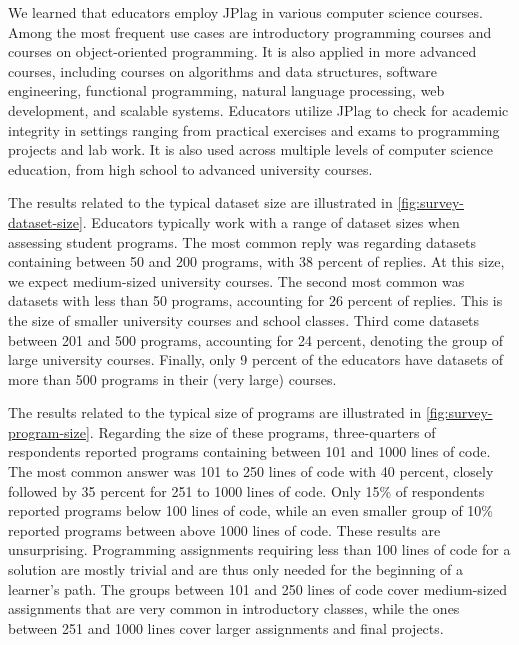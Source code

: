 We learned that educators employ JPlag in various computer science courses.
Among the most frequent use cases are introductory programming courses and courses on object-oriented programming.
It is also applied in more advanced courses, including courses on algorithms and data structures, software engineering, functional programming, natural language processing, web development, and scalable systems.
Educators utilize JPlag to check for academic integrity in settings ranging from practical exercises and exams to programming projects and lab work. It is also used across multiple levels of computer science education, from high school to advanced university courses.

The results related to the typical dataset size are illustrated in \autoref{fig:survey-dataset-size}.
Educators typically work with a range of dataset sizes when assessing student programs.
The most common reply was regarding datasets containing between 50 and 200 programs, with 38 percent of replies.
At this size, we expect medium-sized university courses.
The second most common was datasets with less than 50 programs, accounting for 26 percent of replies.
This is the size of smaller university courses and school classes.
Third come datasets between 201 and 500 programs, accounting for 24 percent, denoting the group of large university courses.
Finally, only 9 percent of the educators have datasets of more than 500 programs in their (very large) courses.

The results related to the typical size of programs are illustrated in \autoref{fig:survey-program-size}.
Regarding the size of these programs, three-quarters of respondents reported programs containing between 101 and 1000 lines of code. The most common answer was 101 to 250 lines of code with 40 percent, closely followed by 35 percent for 251 to 1000 lines of code. Only 15\% of respondents reported programs below 100 lines of code, while an even smaller group of 10\% reported programs between above 1000 lines of code.
These results are unsurprising. Programming assignments requiring less than 100 lines of code for a solution are mostly trivial and are thus only needed for the beginning of a learner's path. The groups between 101 and 250 lines of code cover medium-sized assignments that are very common in introductory classes, while the ones between 251 and 1000 lines cover larger assignments and final projects.

